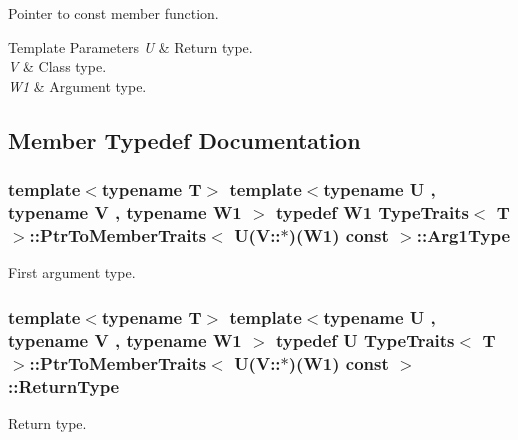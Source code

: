 Pointer to const member function. 
\begin{DoxyTemplParams}{Template Parameters}
{\em U} & Return type. \\
\hline
{\em V} & Class type. \\
\hline
{\em W1} & Argument type. \\
\hline
\end{DoxyTemplParams}


\subsection{Member Typedef Documentation}
\subsubsection[{\texorpdfstring{Arg1\+Type}{Arg1Type}}]{\setlength{\rightskip}{0pt plus 5cm}template$<$typename T$>$ template$<$typename U , typename V , typename W1 $>$ typedef W1 {\bf Type\+Traits}$<$ T $>$\+::{\bf Ptr\+To\+Member\+Traits}$<$ U(V\+::$\ast$)(W1) const  $>$\+::{\bf Arg1\+Type}}\hypertarget{structTypeTraits_1_1PtrToMemberTraits_3_01U_07V_1_1_5_08_07W1_08_01const_01_01_4_a2f29e44d0bfe78e4391e1983f600bdcb}{}\label{structTypeTraits_1_1PtrToMemberTraits_3_01U_07V_1_1_5_08_07W1_08_01const_01_01_4_a2f29e44d0bfe78e4391e1983f600bdcb}
First argument type. 
\subsubsection[{\texorpdfstring{Return\+Type}{ReturnType}}]{\setlength{\rightskip}{0pt plus 5cm}template$<$typename T$>$ template$<$typename U , typename V , typename W1 $>$ typedef U {\bf Type\+Traits}$<$ T $>$\+::{\bf Ptr\+To\+Member\+Traits}$<$ U(V\+::$\ast$)(W1) const  $>$\+::{\bf Return\+Type}}\hypertarget{structTypeTraits_1_1PtrToMemberTraits_3_01U_07V_1_1_5_08_07W1_08_01const_01_01_4_a7a3bdb38504bb3775a00d41ebcc2644d}{}\label{structTypeTraits_1_1PtrToMemberTraits_3_01U_07V_1_1_5_08_07W1_08_01const_01_01_4_a7a3bdb38504bb3775a00d41ebcc2644d}
Return type. 

